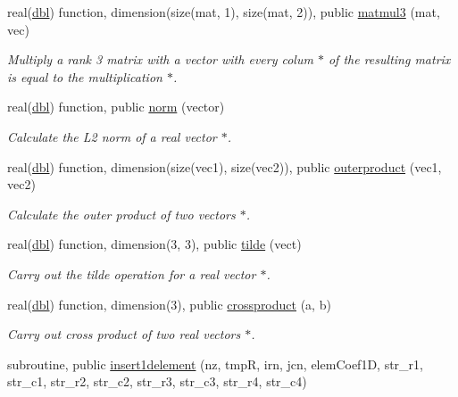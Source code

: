 \begin{DoxyCompactItemize}
real(\hyperlink{namespaceglobaldatafun_a5008801201dd34f2af8eae07756befb4}{dbl}) function, dimension(size(mat, 1), size(mat, 2)), public \hyperlink{namespaceglobaldatafun_a562042b12250dbd7e3ef3a24d9f93a53}{matmul3} (mat, vec)
\begin{DoxyCompactList}\small\item\em Multiply a rank 3 matrix with a vector with every colum $\ast$ of the resulting matrix is equal to the multiplication $\ast$. \end{DoxyCompactList}\item 
real(\hyperlink{namespaceglobaldatafun_a5008801201dd34f2af8eae07756befb4}{dbl}) function, public \hyperlink{namespaceglobaldatafun_a79010ea3a4434936e8a71182e62b6e48}{norm} (vector)
\begin{DoxyCompactList}\small\item\em Calculate the L2 norm of a real vector $\ast$. \end{DoxyCompactList}\item 
real(\hyperlink{namespaceglobaldatafun_a5008801201dd34f2af8eae07756befb4}{dbl}) function, dimension(size(vec1), size(vec2)), public \hyperlink{namespaceglobaldatafun_af49b8ee04a8cfd5d42b863a092e17e91}{outerproduct} (vec1, vec2)
\begin{DoxyCompactList}\small\item\em Calculate the outer product of two vectors $\ast$. \end{DoxyCompactList}\item 
real(\hyperlink{namespaceglobaldatafun_a5008801201dd34f2af8eae07756befb4}{dbl}) function, dimension(3, 3), public \hyperlink{namespaceglobaldatafun_aabcfb273a99323881aa160da1f44a561}{tilde} (vect)
\begin{DoxyCompactList}\small\item\em Carry out the tilde operation for a real vector $\ast$. \end{DoxyCompactList}\item 
real(\hyperlink{namespaceglobaldatafun_a5008801201dd34f2af8eae07756befb4}{dbl}) function, dimension(3), public \hyperlink{namespaceglobaldatafun_a5b4feec69bb3f3464bcd8c08406f9c82}{crossproduct} (a, b)
\begin{DoxyCompactList}\small\item\em Carry out cross product of two real vectors $\ast$. \end{DoxyCompactList}\item 
subroutine, public \hyperlink{namespaceglobaldatafun_a8ea8d9cf6c54128f3e5df19d4d0170da}{insert1delement} (nz, tmpR, irn, jcn, elem\+Coef1D, str\+\_\+r1, str\+\_\+c1, str\+\_\+r2, str\+\_\+c2, str\+\_\+r3, str\+\_\+c3, str\+\_\+r4, str\+\_\+c4)

\end{DoxyCompactItemize}
